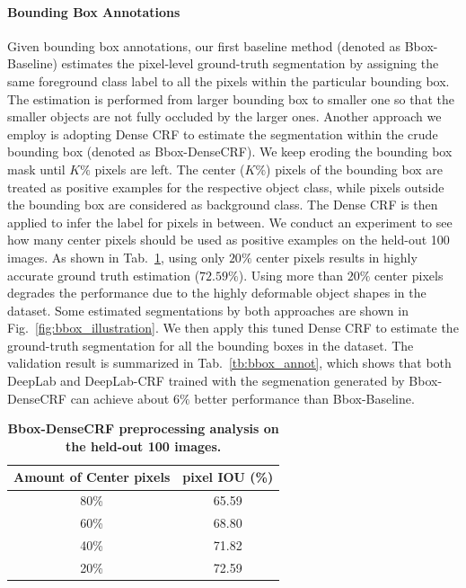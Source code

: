 \paragraph{Bounding Box Annotations} Given bounding box annotations, our first baseline method (denoted as Bbox-Baseline) estimates the pixel-level ground-truth segmentation by assigning the same foreground class label to all the pixels within the particular bounding box. The estimation is performed from larger bounding box to smaller one so that the smaller objects are not fully occluded by the larger ones. Another approach we employ is adopting Dense CRF to estimate the segmentation within the crude bounding box (denoted as Bbox-DenseCRF). We keep eroding the bounding box mask until $K\%$ pixels are left. The center ($K\%$) pixels of the bounding box are treated as positive examples for the respective object class, while pixels outside the bounding box are considered as background class. The Dense CRF is then applied to infer the label for pixels in between. We conduct an experiment to see how many center pixels should be used as positive examples on the held-out 100 images. As shown in Tab.~\ref{tb:bbox_erosion}, using only $20\%$ center pixels results in highly accurate ground truth estimation ($72.59\%$). Using more than $20\%$ center pixels degrades the performance due to the highly deformable object shapes in the dataset. Some estimated segmentations by both approaches are shown in Fig.~\ref{fig:bbox_illustration}. We then apply this tuned Dense CRF to estimate the ground-truth segmentation for all the bounding boxes in the dataset. The validation result is summarized in Tab.~\ref{tb:bbox_annot}, which shows that both DeepLab and DeepLab-CRF trained with the segmenation generated by Bbox-DenseCRF can achieve about $6\%$ better performance than Bbox-Baseline.

\begin{table}
  \centering
  \caption{{\bf{Bbox-DenseCRF preprocessing analysis on the held-out 100 images.}}}
  \begin{tabular}{c | c}
    Amount of Center pixels & pixel IOU (\%) \\
    \hline
    \hline
    80\%  & 65.59 \\
    60\%  & 68.80 \\
    40\%  & 71.82 \\
    20\%  & 72.59 \\
    \end{tabular}
  \label{tb:bbox_erosion}
\end{table}

